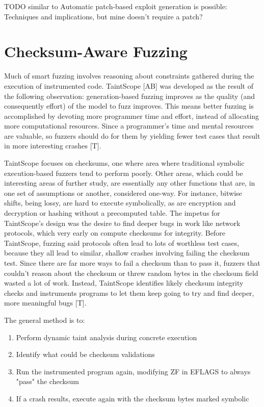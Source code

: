 \documentclass[11pt,expanded,copyright]{fsuthesis}
\begin{document}
TODO similar to Automatic patch-based exploit generation is possible: Techniques and
implications, but mine doesn't require a patch?



\section{Checksum-Aware Fuzzing}

Much of smart fuzzing involves reasoning about constraints gathered during the execution of instrumented code. TaintScope [AB] was developed as the result of the following observation: generation-based fuzzing improves as the quality (and consequently effort) of the model to fuzz improves. This means better fuzzing is accomplished by devoting more programmer time and effort, instead of allocating more computational resources. Since a programmer's time and mental resources are valuable, so fuzzers should do for them by yielding fewer test cases that result in more interesting crashes [T].

TaintScope focuses on checksums, one where area where traditional symbolic execution-based fuzzers tend to perform poorly. Other areas, which could be interesting areas of further study, are essentially any other functions that are, in one set of assumptions or another, considered one-way. For instance, bitwise shifts, being lossy, are hard to execute symbolically, as are encryption and decryption or hashing without a precomputed table. The impetus for TaintScope's design was the desire to find deeper bugs in work like network protocols, which very early on compute checksums for integrity. Before TaintScope, fuzzing said protocols often lead to lots of worthless test cases, because they all lead to similar, shallow crashes involving failing the checksum test. Since there are far more ways to fail a checksum than to pass it, fuzzers that couldn't reason about the checksum or threw random bytes in the checksum field wasted a lot of work. Instead, TaintScope identifies likely checksum integrity checks and instruments programs to let them keep going to try and find deeper, more meaningful bugs [T].

The general method is to:

\begin{enumerate}
	\item Perform dynamic taint analysis during concrete execution
	\item Identify what could be checksum validations
	\item Run the instrumented program again, modifying ZF in EFLAGS to always "pass" the  checksum
	\item If a crash results, execute again with the checksum bytes marked symbolic
\end{enumerate}
\end{document}
